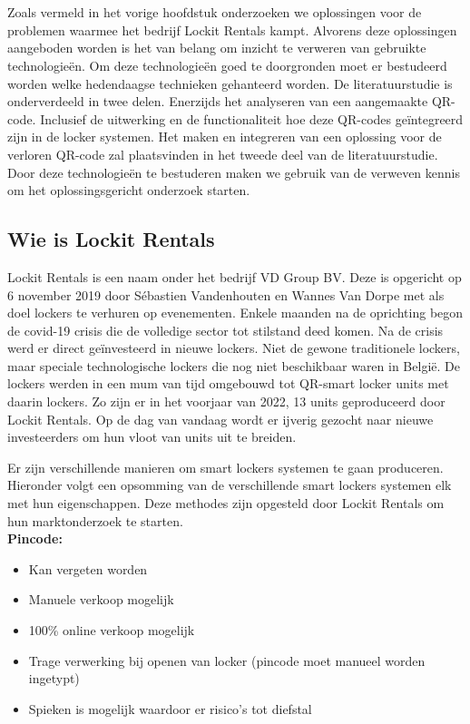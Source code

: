 \chapter{}%
\label{ch:stand-van-zaken}

Zoals vermeld in het vorige hoofdstuk onderzoeken we oplossingen voor de problemen waarmee het bedrijf Lockit Rentals kampt. Alvorens deze oplossingen aangeboden worden is het van belang om inzicht te verweren van gebruikte technologieën. Om deze technologieën goed te doorgronden moet er bestudeerd worden welke hedendaagse technieken gehanteerd worden. De literatuurstudie is onderverdeeld in twee delen. Enerzijds het analyseren van een aangemaakte QR-code. Inclusief de uitwerking en de functionaliteit hoe deze QR-codes geïntegreerd zijn in de locker systemen. Het maken en integreren van een oplossing voor de verloren QR-code zal plaatsvinden in het tweede deel van de literatuurstudie. Door deze technologieën te bestuderen maken we gebruik van de verweven kennis om het oplossingsgericht onderzoek starten.

\section{Wie is Lockit Rentals}%
\label{sec:lockitRentals}


Lockit Rentals is een naam onder het bedrijf VD Group BV. Deze is opgericht op 6 november 2019 door Sébastien Vandenhouten en Wannes Van Dorpe met als doel lockers te verhuren op evenementen. Enkele maanden na de oprichting begon de covid-19 crisis die de volledige sector tot stilstand deed komen. Na de crisis werd er direct geïnvesteerd in nieuwe lockers. Niet de gewone traditionele lockers, maar speciale technologische lockers die nog niet beschikbaar waren in België. De lockers werden in een mum van tijd omgebouwd tot QR-smart locker units met daarin lockers. Zo zijn er in het voorjaar van 2022, 13 units geproduceerd door Lockit Rentals. Op de dag van vandaag wordt er ijverig gezocht naar nieuwe investeerders om hun vloot van units uit te breiden.

Er zijn verschillende manieren om smart lockers systemen te gaan produceren. Hieronder volgt een opsomming van de verschillende smart lockers systemen elk met hun eigenschappen. Deze methodes zijn opgesteld door Lockit Rentals om hun marktonderzoek te starten.
\\
\textbf{Pincode:}
\begin{itemize}
    \item Kan vergeten worden
    \item Manuele verkoop mogelijk
    \item 100\% online verkoop mogelijk
    \item Trage verwerking bij openen van locker (pincode moet manueel worden ingetypt)
    \item Spieken is mogelijk waardoor er risico’s tot diefstal    
\end{itemize}

